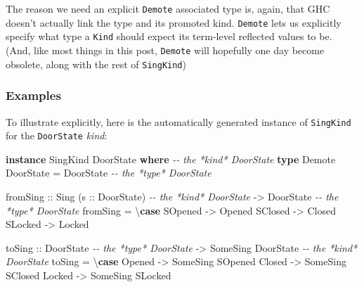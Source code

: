 \documentclass[]{article}
\newenvironment{Shaded}{}{}
\newcommand{\CommentTok}[1]{\textcolor[rgb]{0.38,0.63,0.69}{\textit{#1}}}
\newcommand{\DataTypeTok}[1]{\textcolor[rgb]{0.56,0.13,0.00}{#1}}
\newcommand{\KeywordTok}[1]{\textcolor[rgb]{0.00,0.44,0.13}{\textbf{#1}}}
\newcommand{\NormalTok}[1]{#1}
\newcommand{\OtherTok}[1]{\textcolor[rgb]{0.00,0.44,0.13}{#1}}
\begin{document}
The reason we need an explicit \texttt{Demote} associated type is, again, that
GHC doesn't actually link the type and its promoted kind. \texttt{Demote} lets
us explicitly specify what type a \texttt{Kind} should expect its term-level
reflected values to be. (And, like most things in this post, \texttt{Demote}
will hopefully one day become obsolete, along with the rest of
\texttt{SingKind})

\hypertarget{examples}{%
\subsubsection{Examples}\label{examples}}

To illustrate explicitly, here is the automatically generated instance of
\texttt{SingKind} for the \texttt{DoorState} \emph{kind}:

\begin{Shaded}
\begin{Highlighting}[]
\KeywordTok{instance} \DataTypeTok{SingKind} \DataTypeTok{DoorState} \KeywordTok{where}       \CommentTok{{-}{-} the *kind* DoorState}
    \KeywordTok{type} \DataTypeTok{Demote} \DataTypeTok{DoorState} \OtherTok{=} \DataTypeTok{DoorState}   \CommentTok{{-}{-} the *type* DoorState}

\NormalTok{    fromSing}
\OtherTok{        ::} \DataTypeTok{Sing}\NormalTok{ (}\OtherTok{s ::} \DataTypeTok{DoorState}\NormalTok{)        }\CommentTok{{-}{-} the *kind* DoorState}
        \OtherTok{{-}>} \DataTypeTok{DoorState}                    \CommentTok{{-}{-} the *type* DoorState}
\NormalTok{    fromSing }\OtherTok{=}\NormalTok{ \textbackslash{}}\KeywordTok{case}
        \DataTypeTok{SOpened} \OtherTok{{-}>} \DataTypeTok{Opened}
        \DataTypeTok{SClosed} \OtherTok{{-}>} \DataTypeTok{Closed}
        \DataTypeTok{SLocked} \OtherTok{{-}>} \DataTypeTok{Locked}

\NormalTok{    toSing}
\OtherTok{        ::} \DataTypeTok{DoorState}                    \CommentTok{{-}{-} the *type* DoorState}
        \OtherTok{{-}>} \DataTypeTok{SomeSing} \DataTypeTok{DoorState}           \CommentTok{{-}{-} the *kind* DoorState}
\NormalTok{    toSing }\OtherTok{=}\NormalTok{ \textbackslash{}}\KeywordTok{case}
        \DataTypeTok{Opened} \OtherTok{{-}>} \DataTypeTok{SomeSing} \DataTypeTok{SOpened}
        \DataTypeTok{Closed} \OtherTok{{-}>} \DataTypeTok{SomeSing} \DataTypeTok{SClosed}
        \DataTypeTok{Locked} \OtherTok{{-}>} \DataTypeTok{SomeSing} \DataTypeTok{SLocked}
\end{Highlighting}
\end{Shaded}
\end{document}
